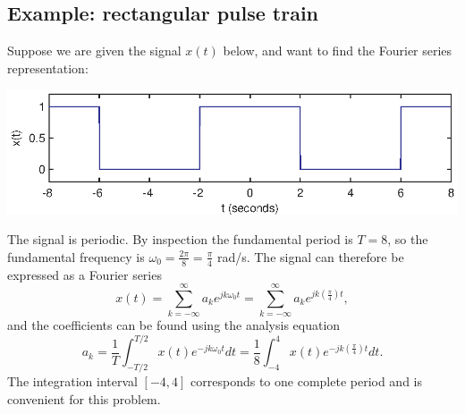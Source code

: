 \documentclass[10pt]{beamer}
\begin{document}
\subsection{Example:  rectangular pulse train}
\label{sec:exrectpulsetrain}
Suppose we are given the signal $x(t)$ below, and want to find the Fourier series representation:
\begin{center}
  \includegraphics{exrectpulsetrain1}
\end{center}
The signal is periodic.  By inspection the fundamental period is $T = 8$, so the fundamental frequency is $\omega_0 = \frac{2 \pi}{8} = \frac{\pi}{4}$ rad/s.  The signal can therefore be expressed as a Fourier series
\begin{equation*}
  x(t) = \sum_{k=-\infty}^{\infty} a_k e^{j k \omega_0 t} = \sum_{k=-\infty}^{\infty} a_k e^{j k \left( \frac{\pi}{4} \right) t},
\end{equation*}
and the coefficients can be found using the analysis equation
\begin{equation*}
  a_k = \frac{1}{T} \int_{-T/2}^{T/2} x(t) e^{-j k \omega_0 t} dt = \frac{1}{8} \int_{-4}^{4} x(t) e^{-j k \left( \frac{\pi}{4} \right) t} dt.
\end{equation*}
The integration interval $[-4,4]$ corresponds to one complete period and is convenient for this problem.
\end{document}
